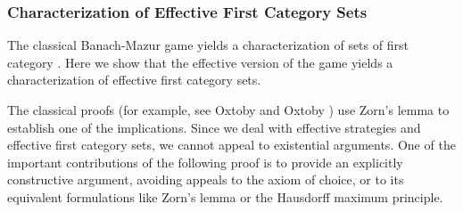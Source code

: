 \documentclass[a4paper,UKenglish,autoref,thm-restate,numberwithinsect]{lipics-v2021}
\begin{document}
\subsubsection{Characterization of Effective First Category Sets}

The classical Banach-Mazur game yields a characterization of sets of first category \cite{Oxtoby1957}. Here we show that the effective version of the game yields a characterization of effective first category sets. 

The classical proofs (for example, see Oxtoby \cite{Oxtoby1957} and Oxtoby \cite{Oxtoby1980}) use Zorn's lemma to establish one of the implications. Since we deal with effective strategies and effective first category sets, we cannot appeal to existential arguments. One of the important contributions of the following proof is to provide an explicitly constructive argument, avoiding appeals to the axiom of choice, or to its equivalent formulations like Zorn's lemma or the Hausdorff maximum principle. 
\end{document}
